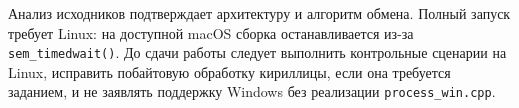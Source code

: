 \documentclass[12pt,a4paper]{article}
\begin{document}
Анализ исходников подтверждает архитектуру и алгоритм обмена. Полный запуск требует Linux: на доступной macOS сборка останавливается из-за \texttt{sem\_timedwait()}. До сдачи работы следует выполнить контрольные сценарии на Linux, исправить побайтовую обработку кириллицы, если она требуется заданием, и не заявлять поддержку Windows без реализации \texttt{process\_win.cpp}.
\end{document}
